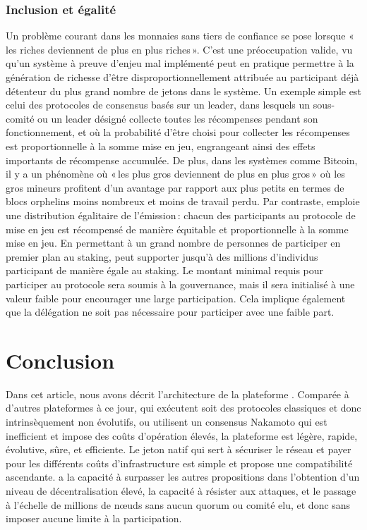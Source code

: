 \documentclass[runningheads,francais,a4paper]{llncs}
\begin{document}
\subsubsection{Inclusion et égalité}
Un problème courant dans les monnaies sans tiers de confiance se pose lorsque «\,les riches deviennent de plus en plus
riches\,». C'est une préoccupation valide, vu qu'un système à preuve d'enjeu mal implémenté peut en pratique permettre à
la génération de richesse d'être disproportionnellement attribuée au participant déjà détenteur du plus grand nombre de
jetons dans le système. Un exemple simple est celui des protocoles de consensus basés sur un leader, dans lesquels un
sous-comité ou un leader désigné collecte toutes les récompenses pendant son fonctionnement, et où la probabilité d'être
choisi pour collecter les récompenses est proportionnelle à la somme mise en jeu, engrangeant ainsi des effets
importants de récompense accumulée. De plus, dans les systèmes comme Bitcoin, il y a un phénomène où «\,les plus gros
deviennent de plus en plus gros\,» où les gros mineurs profitent d'un avantage par rapport aux plus petits en termes
de blocs orphelins moins nombreux et moins de travail perdu. Par contraste, \AVAPlatformName{} emploie une distribution
égalitaire de l'émission\,: chacun des participants au protocole de mise en jeu est récompensé de manière équitable et
proportionnelle à la somme mise en jeu. En permettant à un grand nombre de personnes de participer en premier plan
au staking, \AVAPlatformName{} peut supporter jusqu'à des millions d'individus participant de manière égale au staking. Le
montant minimal requis pour participer au protocole sera soumis à la gouvernance, mais il sera initialisé à une valeur
faible pour encourager une large participation. Cela implique également que la délégation ne soit pas nécessaire pour
participer avec une faible part.

\section{Conclusion}
\label{section:conclusion}
Dans cet article, nous avons décrit l'architecture de la plateforme \AVAPlatformName{}. Comparée à d'autres plateformes à
ce jour, qui exécutent soit des protocoles classiques et donc intrinsèquement non évolutifs, ou utilisent un consensus
Nakamoto qui est inefficient et impose des coûts d'opération élevés, la plateforme \AVAPlatformName{} est légère, rapide,
évolutive, sûre, et efficiente. Le jeton natif qui sert à sécuriser le réseau et payer pour les différents coûts
d'infrastructure est simple et propose une compatibilité ascendante. \AVATokenName{} a la capacité à surpasser les
autres propositions dans l'obtention d'un niveau de décentralisation élevé, la capacité à résister aux attaques, et le
passage à l'échelle de millions de nœuds sans aucun quorum ou comité elu, et donc sans imposer aucune limite à la
participation.
\end{document}
